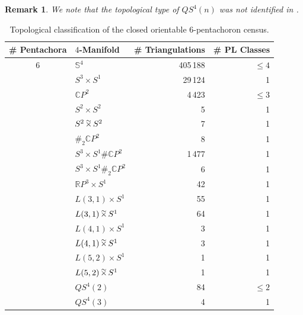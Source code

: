 \documentclass[pdflatex,sn-mathphys-num]{sn-jnl}
\theoremstyle{thmstyleone}%
\theoremstyle{thmstyletwo}%
\newtheorem{remark}{Remark}%
\theoremstyle{thmstylethree}%
\newcommand{\twprod}{\mathbin{
		\ooalign{\raise1.15ex\hbox{$\scriptstyle\sim$}\cr\hidewidth$\times$\hidewidth\cr}
}}
\theoremstyle{remark}
\begin{document}
\begin{remark}
    We note that the topological type of $QS^4(n)$ was not identified in \cite{perez}.
\end{remark}

\begin{table}[ht]
    \caption{Topological classification of the closed orientable 6-pentachoron census.}
\label{tab:6p-TOPclassTable}
    \begin{tabular}{clrr}
    	\toprule
        \# Pentachora & $4$-Manifold & \# Triangulations & \# PL Classes\\
\midrule
        6   & $\mathbb{S}^4$ & 405\,188                  &   $\leq 4 $   \\
            & $S^3\times S^1$ & 29\,124                  &   1   \\
            & $\mathbb{C}P^2$ & 4\,423                   &   $\leq 3$  \\
            & $S^2\times S^2$ & 5                       &   1   \\
            & $S^2\twprod S^2$ & 7                      &   1   \\
            & $\#_2\mathbb{C}P^2$ & 8                   &   1   \\
            & $S^3\times S^1\#\mathbb{C}P^2$ & 1\,477    &   1   \\
            & $S^3\times S^1\#_2\mathbb{C}P^2$ & 6      &   1   \\
            & $\mathbb{R}P^3\times S^1$ & 42            &   1   \\
            & $L(3,1)\times S^1$ & 55                   &   1   \\
            & $L(3,1)\twprod S^1$ & 64                  &   1   \\
            & $L(4,1)\times S^1$ & 3                    &   1   \\
            & $L(4,1)\twprod S^1$ & 3                   &   1   \\
            & $L(5,2)\times S^1$ & 1                    &   1   \\
            & $L(5,2)\twprod S^1$ & 1                   &   1   \\
            & $QS^4(2)$ & 84                            &   $\leq 2$\\
            & $QS^4(3)$ & 4                             &   1\\
\bottomrule
    \end{tabular}
\end{table} 
\end{document}
